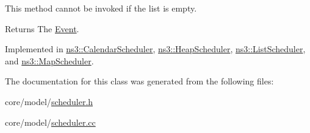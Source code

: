This method cannot be invoked if the list is empty.

\begin{DoxyReturn}{Returns}
The \hyperlink{structns3_1_1Scheduler_1_1Event}{Event}. 
\end{DoxyReturn}


Implemented in \hyperlink{classns3_1_1CalendarScheduler_ad86df04ee956851c73dfcc38d0fb3ac6}{ns3\+::\+Calendar\+Scheduler}, \hyperlink{classns3_1_1HeapScheduler_a97e15b27a21ddedd4346d66b21d97144}{ns3\+::\+Heap\+Scheduler}, \hyperlink{classns3_1_1ListScheduler_a3504eb24949d1656d73da9bfc38a2773}{ns3\+::\+List\+Scheduler}, and \hyperlink{classns3_1_1MapScheduler_a0fff1cb7fcb512e768f3d22898c20f08}{ns3\+::\+Map\+Scheduler}.



The documentation for this class was generated from the following files\+:\begin{DoxyCompactItemize}
\item 
core/model/\hyperlink{scheduler_8h}{scheduler.\+h}\item 
core/model/\hyperlink{scheduler_8cc}{scheduler.\+cc}\end{DoxyCompactItemize}
